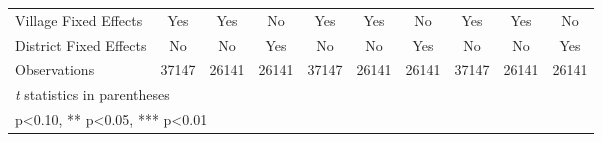 \begin{sidewaystable}[htbp]
\begin{tabular}{l*{9}{c}}
Village Fixed Effects&      Yes   &      Yes   &       No   &      Yes   &      Yes   &       No   &      Yes   &      Yes   &       No   \\
District Fixed Effects&       No   &       No   &      Yes   &       No   &       No   &      Yes   &       No   &       No   &      Yes   \\
\midrule
Observations    &    37147   &    26141   &    26141   &    37147   &    26141   &    26141   &    37147   &    26141   &    26141   \\
\bottomrule
\multicolumn{10}{l}{\footnotesize \textit{t} statistics in parentheses}\\
\multicolumn{10}{l}{\footnotesize * p<0.10, ** p<0.05, *** p<0.01}\\
\end{tabular}
\end{sidewaystable}
